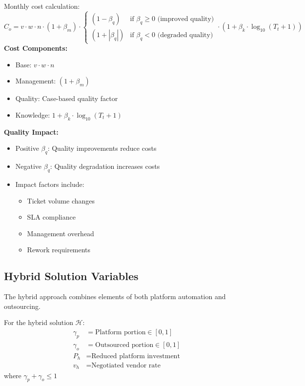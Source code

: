 \documentclass[12pt,a4paper]{article}
\newenvironment{definition}[1]
{\begin{mdframed}[style=definitionstyle,frametitle={Definition: #1}]}
{\end{mdframed}}
\newenvironment{observation}
{\begin{mdframed}[style=observationstyle,frametitle={Observation}]}
{\end{mdframed}}
\begin{document}
\begin{definition}{Outsourcing Cost}
Monthly cost calculation:
\begin{equation}
    C_o = v \cdot w \cdot n \cdot (1 + \beta_m) \cdot \begin{cases}
        (1 - \beta_q) & \text{if } \beta_q \geq 0 \text{ (improved quality)} \\
        (1 + |\beta_q|) & \text{if } \beta_q < 0 \text{ (degraded quality)}
    \end{cases} \cdot (1 + \beta_k \cdot \log_{10}(T_t + 1))
\end{equation}
\textbf{Cost Components:}
\begin{itemize}
    \item Base: $v \cdot w \cdot n$
    \item Management: $(1 + \beta_m)$
    \item Quality: Case-based quality factor
    \item Knowledge: $1 + \beta_k \cdot \log_{10}(T_t + 1)$
\end{itemize}
\end{definition}

\begin{observation}
\textbf{Quality Impact:}
\begin{itemize}
    \item Positive $\beta_q$: Quality improvements reduce costs
    \item Negative $\beta_q$: Quality degradation increases costs
    \item Impact factors include:
        \begin{itemize}
            \item Ticket volume changes
            \item SLA compliance
            \item Management overhead
            \item Rework requirements
        \end{itemize}
\end{itemize}
\end{observation}

\subsection{Hybrid Solution Variables}
The hybrid approach combines elements of both platform automation and outsourcing.

\begin{definition}{Hybrid Variables}
For the hybrid solution $\mathcal{H}$:
\begin{align*}
    \gamma_p &= \text{Platform portion} \in [0,1] \\
    \gamma_o &= \text{Outsourced portion} \in [0,1] \\
    P_h &= \text{Reduced platform investment} \\
    v_h &= \text{Negotiated vendor rate}
\end{align*}
where $\gamma_p + \gamma_o \leq 1$
\end{definition}
\end{document}
